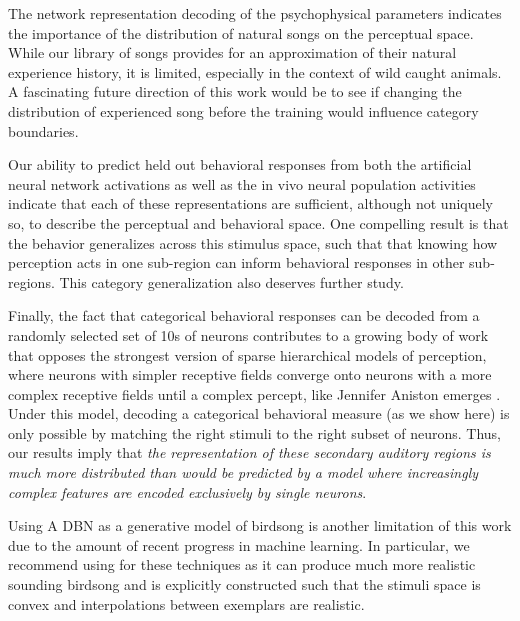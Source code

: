 
The network representation decoding of the psychophysical parameters indicates the importance of the distribution of natural songs on the perceptual space. While our library of songs provides for an approximation of their natural experience history, it is limited, especially in the context of wild caught animals. A fascinating future direction of this work would be to see if changing the distribution of experienced song before the training would influence category boundaries.

Our ability to predict held out behavioral responses from both the artificial neural network activations as well as the in vivo neural population activities indicate that each of these representations are sufficient, although not uniquely so, to describe the perceptual and behavioral space. One compelling result is that the behavior generalizes across this stimulus space, such that that knowing how perception acts in one sub-region can inform behavioral responses in other sub-regions. This category generalization also deserves further study.

Finally, the fact that categorical behavioral responses can be decoded from a randomly selected set of 10s of neurons contributes to a growing body of work \cite{jeanne2011emergence,kozlov2016central} that opposes the strongest version of sparse hierarchical models of perception, where neurons with simpler receptive fields converge onto neurons with a more complex receptive fields until a complex percept, like Jennifer Aniston emerges \cite{quiroga2005invariant}. Under this model, decoding a categorical behavioral measure (as we show here) is only possible by matching the right stimuli to the right subset of neurons. Thus, our results imply that \emph{the representation of these secondary auditory regions is much more distributed than would be predicted by a model where increasingly complex features are encoded exclusively by single neurons}.

Using A DBN as a generative model of birdsong is another limitation of this work due to the amount of recent progress in machine learning. In particular, we recommend using \cite{GAIA} for these techniques as it can produce much more realistic sounding birdsong and is explicitly constructed such that the stimuli space is convex and interpolations between exemplars are realistic.

